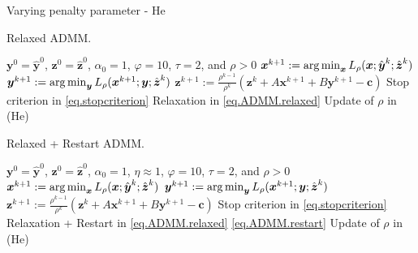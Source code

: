 \documentclass[8pt,red]{beamer}
\theoremstyle{plain}
\theoremstyle{definition}
\theoremstyle{remark}
\newcommand{\refalg}[1]{Algorithm~\ref{#1}}
\newcommand{\argmin}{\operatornamewithlimits{\mathrm{arg\,min}}}
\newcommand{\bi}[1]{\ensuremath{\boldsymbol{#1}}}
\begin{document}
\begin{frame}{Varying penalty parameter - He}
\begin{algorithm}[H]
  \scriptsize
  \caption{Relaxed ADMM.}
  \label{alg:prototype.vp-R-He}
  \begin{algorithmic}[1]
    \Require
    $\bi{y}^{0} = \hat{\bi{y}}^{0}$, $\bi{z}^{0}=\hat{\bi{z}}^{0}$, $\alpha_{0}=1$, $\varphi = 10$, $\tau = 2$, and $\rho > 0$ 
    \State
    $\bi{x}^{k+1} 
    := \argmin_{\bi{x}} L_{\rho}(\bi{x};\hat{\bi{y}}^{k};\hat{\bi{z}}^{k})$ 
    \State
    $\bi{y}^{k+1} 
    := \argmin_{\bi{y}} L_{\rho}(\bi{x}^{k+1};\bi{y};\hat{\bi{z}}^{k})$ 
    \State
    $\bi{z}^{k+1} 
  := \frac{\rho^{k-1}}{\rho^{k}} \left( \bi{z}^{k} + A \bi{x}^{k+1} + B \bi{y}^{k+1} - \bi{c} \right)$ 
    \State
    Stop criterion in \eqref{eq.stopcriterion}
    \State
    Relaxation in \eqref{eq.ADMM.relaxed}
    \State
    Update of $\rho$ in (He)
    \EndFor
  \end{algorithmic}
\end{algorithm}

\begin{algorithm}[H]
  \scriptsize
  \caption{Relaxed + Restart ADMM.}
  \label{alg:prototype.vp-RR-He}
  \begin{algorithmic}[1]
    \Require
    $\bi{y}^{0} = \hat{\bi{y}}^{0}$, $\bi{z}^{0}=\hat{\bi{z}}^{0}$, 
    $\alpha_{0}=1$, $\eta \approx 1$, $\varphi = 10$, $\tau = 2$, and $\rho > 0$ 
    \State
    $\bi{x}^{k+1} 
    := \argmin_{\bi{x}} L_{\rho}(\bi{x};\hat{\bi{y}}^{k};\hat{\bi{z}}^{k})$ 
    \State
    $\bi{y}^{k+1} 
    := \argmin_{\bi{y}} L_{\rho}(\bi{x}^{k+1};\bi{y};\hat{\bi{z}}^{k})$ 
    \State
    $\bi{z}^{k+1} 
  := \frac{\rho^{k-1}}{\rho^{k}} \left( \bi{z}^{k} + A \bi{x}^{k+1} + B \bi{y}^{k+1} - \bi{c} \right)$ 
    \State
    Stop criterion in \eqref{eq.stopcriterion}
    \State
    Relaxation + Restart in \eqref{eq.ADMM.relaxed} \eqref{eq.ADMM.restart}
    \State
    Update of $\rho$ in (He)
    \EndFor
  \end{algorithmic}
\end{algorithm}
\end{frame}
\end{document}

